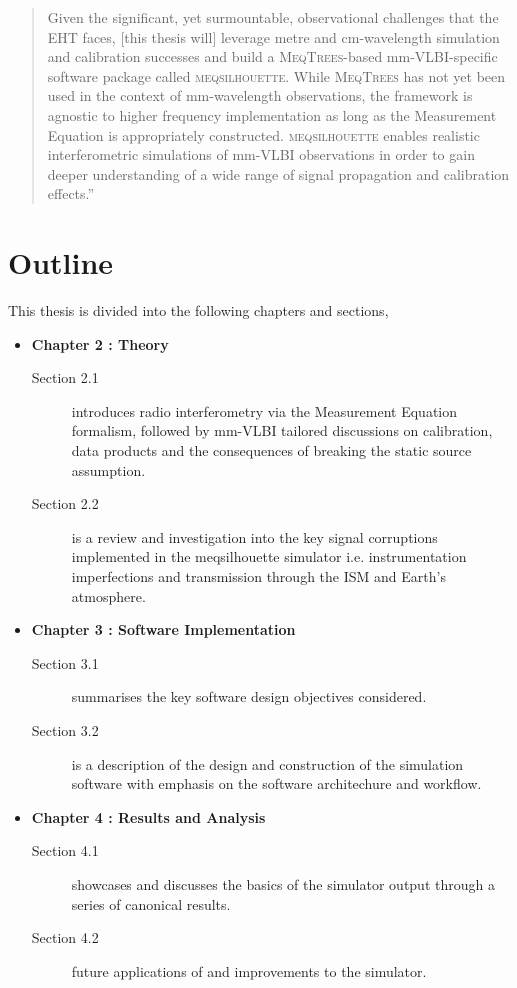 \begin{quotation}
Given the significant, yet surmountable, observational challenges that the EHT faces, [this thesis will] leverage metre and cm-wavelength simulation and calibration successes and build a \textsc{MeqTrees}-based mm-VLBI-specific software package called \textsc{meqsilhouette}. While \textsc{MeqTrees} has not yet been used in the context of mm-wavelength observations, the framework is agnostic to higher frequency implementation as long as the Measurement Equation is appropriately constructed. \textsc{meqsilhouette} enables realistic interferometric simulations of mm-VLBI observations in order to gain deeper understanding of a wide range of signal propagation and calibration effects.''\\
\citep{Blecher_2016}
\end{quotation}
 
\section{Outline}
This thesis is divided into the following chapters and sections,
\begin{itemize}
 \item {\bf Chapter 2 : Theory} 
 \begin{description}
  \item [Section 2.1] introduces radio interferometry via the Measurement Equation formalism, followed by mm-VLBI tailored discussions on calibration, data products and the consequences of breaking the static source assumption.
  \item [Section 2.2] is a review and investigation into the key signal corruptions implemented in the {\sc meqsilhouette} simulator i.e. instrumentation imperfections and transmission through the ISM and Earth's atmosphere.
 \end{description}

 \item {\bf Chapter 3 : Software Implementation}
 \begin{description}
  \item [Section 3.1] summarises the key software design objectives considered.
  \item [Section 3.2] is a description of the design and construction of the simulation software with emphasis on the software architechure and workflow.
 \end{description}

 
 \item {\bf Chapter 4 : Results and Analysis}
 \begin{description}
  \item  [Section 4.1] showcases and discusses the basics of the simulator output through a series of canonical results.
  \item [Section 4.2] future applications of and improvements to the simulator.
 \end{description}
 

\end{itemize}

















